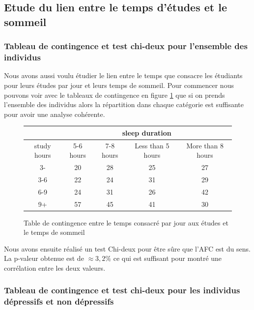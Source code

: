 \subsection{Etude du lien entre le temps d'études et le sommeil}

\subsubsection{Tableau de contingence et test chi-deux pour l'ensemble des individus}

Nous avons aussi voulu étudier le lien entre le temps que consacre les étudiants pour leurs études par jour et leurs temps de sommeil.
Pour commencer nous pouvons voir avec le tableaux de contingence en figure \ref{tab:contTableStudySleepAll} que si on prends l'ensemble des individus alors la répartition dans chaque catégorie est suffisante pour avoir une analyse cohérente. 

\begin{figure}[!h]
    \begin{center}
      \begin{tabular}{|c|c|c|c|c|}
        \hline 
        & \multicolumn{4}{|c|}{sleep duration}\\ 
        \hline
        study hours & 5-6 hours & 7-8 hours & Less than 5 hours & More than 8 hours\\ 
        \hline 
        3- & 20 & 28 & 25 & 27\\ 
        \hline 
        3-6 & 22 & 24 & 31 & 29\\ 
        \hline 
        6-9 & 24 & 31 & 26 & 42\\ 
        \hline 
        9+ & 57 & 45 & 41 & 30 \\ 
        \hline
      \end{tabular}
    \end{center}
    \caption{Table de contingence entre le temps consacré par jour aux études et le temps de sommeil}
    \label{tab:contTableStudySleepAll}
\end{figure}

Nous avons ensuite réalisé un test Chi-deux pour être sûre que l'AFC est du sens. La p-valeur obtenue est de $\approx3,2\%$ ce qui est suffisant pour montré une corrélation entre les deux valeurs.

\subsubsection{Tableau de contingence et test chi-deux pour les individus dépressifs et non dépressifs}

